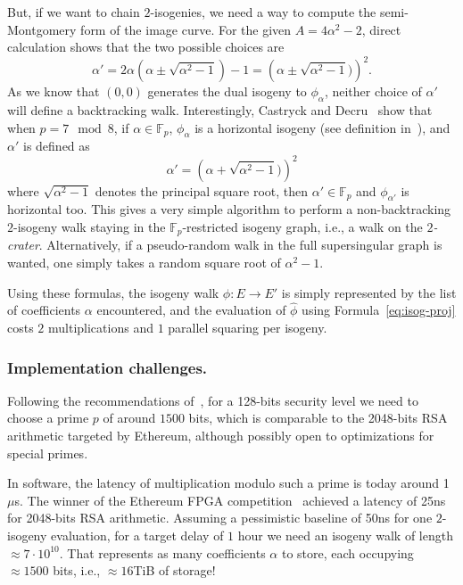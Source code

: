 \documentclass{llncs}
\newcommand{\F}{\mathbb{F}}
\begin{document}
But, if we want to chain $2$-isogenies, we need a way to compute the
semi-Montgomery form of the image curve. %
For the given $A=4\alpha^2-2$, direct calculation shows that the two
possible choices are
\begin{equation}
  \label{eq:next-curve}
  \alpha' = 2\alpha\left(\alpha \pm \sqrt{\alpha^2 - 1}\right) - 1
  = \left(\alpha \pm \sqrt{\alpha^2-1})\right)^2.
\end{equation}
As we know that $(0,0)$ generates the dual isogeny to $\phi_\alpha$,
neither choice of $\alpha'$ will define a backtracking walk. %
Interestingly, Castryck and Decru~\cite{cryptoeprint:2019:1404} show
that when $p=7\mod 8$, if $\alpha\in\F_p$, $\phi_\alpha$ is a
horizontal isogeny (see definition in~\cite{cryptoeprint:2019:1404}),
and $\alpha'$ is defined as
\[\alpha' = \left(\alpha + \sqrt{\alpha^2-1})\right)^2\]
where $\sqrt{\alpha^2-1}$ denotes the principal square root, then
$\alpha'\in\F_p$ and $\phi_{\alpha'}$ is horizontal too. %
This gives a very simple algorithm to perform a non-backtracking
$2$-isogeny walk staying in the $\F_p$-restricted isogeny graph, i.e.,
a walk on the \emph{$2$-crater}. %
Alternatively, if a pseudo-random walk in the full supersingular graph
is wanted, one simply takes a random square root of $\alpha^2-1$.

Using these formulas, the isogeny walk $\phi:E\to E'$ is simply
represented by the list of coefficients $\alpha$ encountered, and the
evaluation of $\hat\phi$ using Formula~\eqref{eq:isog-proj} costs $2$
multiplications and $1$ parallel squaring per isogeny.

\subsubsection{Implementation challenges.}
Following the recommendations of~\cite{10.1007/978-3-030-34578-5_10},
for a 128-bits security level we need to choose a prime $p$ of around
$1500$ bits, which is comparable to the 2048-bits RSA arithmetic
targeted by Ethereum, although possibly open to optimizations for
special primes.

In software, the latency of multiplication modulo such a prime is
today around 1$\mu$s. %
The winner of the Ethereum FPGA competition~\cite{ethereum-vdf}
achieved a latency of 25ns for 2048-bits RSA arithmetic. %
Assuming a pessimistic baseline of 50ns for one $2$-isogeny
evaluation, for a target delay of $1$ hour we need an isogeny walk of length
$\approx 7\cdot 10^{10}$. %
That represents as many coefficients $\alpha$ to store, each occupying
$\approx 1500$ bits, i.e., $\approx 16$TiB of storage!
\end{document}
